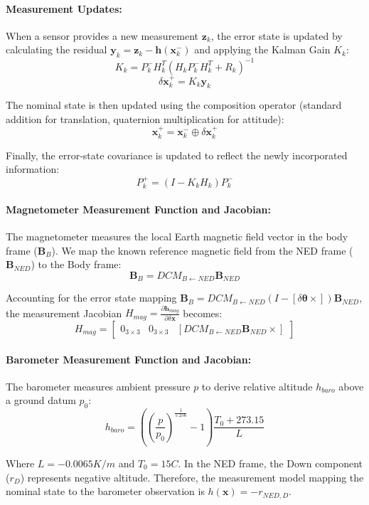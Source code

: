 \documentclass[11pt, a4paper]{article} %
\begin{document}
\paragraph{Measurement Updates:}
When a sensor provides a new measurement $\mathbf{z}_k$, the error state is updated by calculating the residual $\mathbf{y}_k = \mathbf{z}_k - \mathbf{h}(\mathbf{x}_k^-)$ and applying the Kalman Gain $K_k$:
\[
K_k = P_k^- H_k^T (H_k P_k^- H_k^T + R_k)^{-1}
\]
\[
\delta\mathbf{x}_k^+ = K_k \mathbf{y}_k
\]

The nominal state is then updated using the composition operator (standard addition for translation, quaternion multiplication for attitude):
\[
\mathbf{x}_k^+ = \mathbf{x}_k^- \oplus \delta\mathbf{x}_k^+
\]

Finally, the error-state covariance is updated to reflect the newly incorporated information:
\[
P_k^+ = (I - K_k H_k) P_k^-
\]

\paragraph{Magnetometer Measurement Function and Jacobian:}
The magnetometer measures the local Earth magnetic field vector in the body frame ($\mathbf{B}_B$). We map the known reference magnetic field from the NED frame ($\mathbf{B}_{NED}$) to the Body frame:
\[
\mathbf{B}_B = DCM_{B \leftarrow NED} \mathbf{B}_{NED}
\]

Accounting for the error state mapping $\mathbf{B}_B = DCM_{B \leftarrow NED} (I - [\delta\boldsymbol{\theta} \times]) \mathbf{B}_{NED}$, the measurement Jacobian $H_{mag} = \frac{\partial \mathbf{h}_{mag}}{\partial \delta\mathbf{x}}$ becomes:
\[
H_{mag} = \begin{bmatrix} 0_{3\times3} & 0_{3\times3} & [DCM_{B \leftarrow NED} \mathbf{B}_{NED} \times] \end{bmatrix}
\]

\paragraph{Barometer Measurement Function and Jacobian:}
The barometer measures ambient pressure $p$ to derive relative altitude $h_{baro}$ above a ground datum $p_0$:
\[
h_{baro} = \left(\left(\frac{p}{p_0}\right)^{\frac{1}{5.256}} - 1\right)\frac{T_0 + 273.15}{L}
\]

Where $L = -0.0065 K/m$ and $T_0 = 15 C$. In the NED frame, the Down component ($r_D$) represents negative altitude. Therefore, the measurement model mapping the nominal state to the barometer observation is $h(\mathbf{x}) = -r_{NED, D}$.
\end{document}
